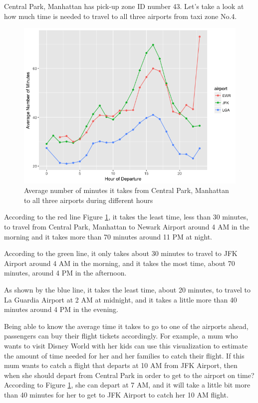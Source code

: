 \documentclass[12pt,twoside]{reedthesis}
\theoremstyle{definition}
\theoremstyle{definition}
\theoremstyle{definition}
\theoremstyle{remark}
\begin{document}
Central Park, Manhattan has pick-up zone ID number 43. Let's take a look
at how much time is needed to travel to all three airports from taxi
zone No.4.
\begin{figure}
\includegraphics[width=5.67in]{figure/airport_vis} \caption{Average number of minutes it takes from Central Park, Manhattan to all three airports during different hours}\label{fig:airport-vis}
\end{figure}
According to the red line Figure \ref{fig:airport-vis}, it takes the
least time, less than 30 minutes, to travel from Central Park, Manhattan
to Newark Airport around 4 AM in the morning and it takes more than 70
minutes around 11 PM at night.

According to the green line, it only takes about 30 minutes to travel to
JFK Airport around 4 AM in the morning, and it takes the most time,
about 70 minutes, around 4 PM in the afternoon.

As shown by the blue line, it takes the least time, about 20 minutes, to
travel to La Guardia Airport at 2 AM at midnight, and it takes a little
more than 40 minutes around 4 PM in the evening.

Being able to know the average time it takes to go to one of the
airports ahead, passengers can buy their flight tickets accordingly. For
example, a mum who wants to visit Disney World with her kids can use
this visualization to estimate the amount of time needed for her and her
families to catch their flight. If this mum wants to catch a flight that
departs at 10 AM from JFK Airport, then when she should depart from
Central Park in order to get to the airport on time? According to Figure
\ref{fig:airport-vis}, she can depart at 7 AM, and it will take a little
bit more than 40 minutes for her to get to JFK Airport to catch her 10
AM flight.
\end{document}
